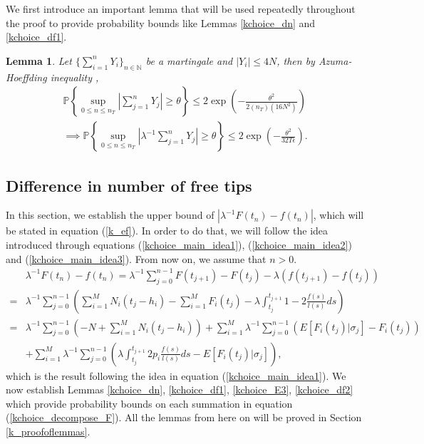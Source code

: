 \documentclass[12pt]{article}
\def\P{\mathbb{P}}
\numberwithin{equation}{section}  %
\newtheorem{lem}[thm]{Lemma}
\begin{document}
We first introduce an important lemma that will be used repeatedly throughout the proof to provide probability bounds like Lemmas \ref{kchoice_dn} and \ref{kchoice_df1}.
\begin{lem}\label{kchoice_azuma}
Let $\{\sum_{i=1}^{n}Y_i\}_{n\in\mathbb{N}}$ be a martingale and $|Y_i|\leq 4N$, then by Azuma-Hoeffding inequality \cite{Williams91},
\begin{align*} 
\P\left\{\sup_{0\leq n\leq n_T}\left|\sum_{j=1}^{n}Y_j\right|\geq \theta\right\}\leq 2\exp\left(-\frac{\theta^2}{2(n_T)(16N^2)}\right)\\
\implies\P\left\{\sup_{0\leq n\leq n_T}\left|\lambda^{-1}\sum_{j=1}^{n}Y_j\right|\geq \theta\right\} 
\leq 2\exp\left(-\frac{\theta^2}{32T\epsilon}\right).
\end{align*}  
\end{lem}

\subsection{Difference in number of free tips}\label{k_df_freetips} 
In this section, we establish the upper bound of $|\lambda^{-1}F(t_n)-f(t_n)|$, which will be stated in equation (\ref{k_ef}). In order to do that, we will follow the idea introduced through equations (\ref{kchoice_main_idea1}), (\ref{kchoice_main_idea2}) and (\ref{kchoice_main_idea3}). From now on, we assume that $n>0$.
\begin{align}
&\lambda^{-1}F(t_n)-f(t_n)=\lambda^{-1}\sum_{j=0}^{n-1}F(t_{j+1})-F(t_j)-\lambda(f(t_{j+1})-f(t_j))\nonumber\\
=&\lambda^{-1}\sum_{j=0}^{n-1}\left(
\sum_{i=1}^{M} N_i(t_j-h_i)-\sum_{i=1}^{M}F_i(t_j)
-\lambda\int_{t_j}^{t_{j+1}} 1-2\frac{f(s)}{l(s)}ds
\right)\nonumber\\
=&\lambda^{-1}\sum_{j=0}^{n-1}\left(
-N+
\sum_{i=1}^{M} N_i(t_j-h_i)
\right)+\sum_{i=1}^{M}\lambda^{-1}\sum_{j=0}^{n-1}
\left(
E[F_i(t_j)|\sigma_j]-F_i(t_j)
\right)\nonumber\\
&+\sum_{i=1}^{M}\lambda^{-1}\sum_{j=0}^{n-1}
\left(
\lambda\int_{t_j}^{t_{j+1}} 2p_i\frac{f(s)}{l(s)}ds-E[F_i(t_j)|\sigma_j]
\right)\label{kchoice_decompose_F},
\end{align}
which is the result following the idea in equation (\ref{kchoice_main_idea1}). We now establish Lemmas \ref{kchoice_dn}, \ref{kchoice_df1}, \ref{kchoice_E3}, \ref{kchoice_df2} which provide probability bounds on each summation in equation (\ref{kchoice_decompose_F}). All the lemmas from here on will be proved in Section \ref{k_proofoflemmas}.
\end{document}
